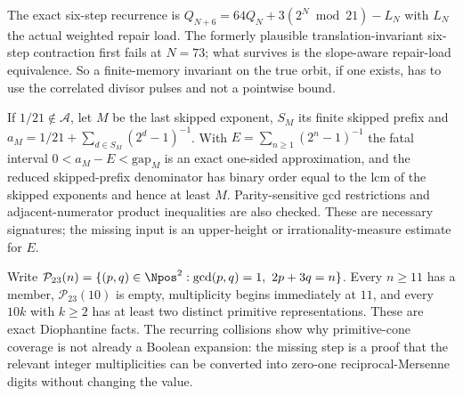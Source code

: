 \begin{obs}
The exact six-step recurrence is
$Q_{N+6}=64Q_N+3(2^N\bmod21)-L_N$ with $L_N$ the actual weighted repair load.
The formerly plausible translation-invariant six-step contraction first fails
at $N=73$; what survives is the slope-aware repair-load equivalence.  So a
finite-memory invariant on the true orbit, if one exists, has to use the
correlated divisor pulses and not a pointwise bound.
\par\noindent{}  
\end{obs}

\begin{obs}
If $1/21\notin\mathcal A$, let $M$ be the last skipped exponent, $S_M$ its
finite skipped prefix and $a_M=1/21+\sum_{d\in S_M}(2^d-1)^{-1}$.  With
$E=\sum_{n\ge1}(2^n-1)^{-1}$ the fatal interval $0<a_M-E<\mathrm{gap}_M$ is an
exact one-sided approximation, and the reduced skipped-prefix denominator has
binary order equal to the lcm of the skipped exponents and hence at least
$M$.  Parity-sensitive gcd restrictions and adjacent-numerator product
inequalities are also checked.  These are necessary signatures; the missing
input is an upper-height or irrationality-measure estimate for $E$.
\par\noindent{}  
\end{obs}

\begin{obs}
Write $\mathcal P_{23}(n)=\{(p,q)\in\Npos^2:\gcd(p,q)=1,\ 2p+3q=n\}$.  Every
$n\ge11$ has a member, $\mathcal P_{23}(10)$ is empty, multiplicity begins
immediately at $11$, and every $10k$ with $k\ge2$ has at least two distinct
primitive representations.  These are exact Diophantine facts.  The recurring
collisions show why primitive-cone coverage is not already a Boolean
expansion: the missing step is a proof that the relevant integer
multiplicities can be converted into zero-one reciprocal-Mersenne digits
without changing the value.
\par\noindent{}  
\end{obs}

